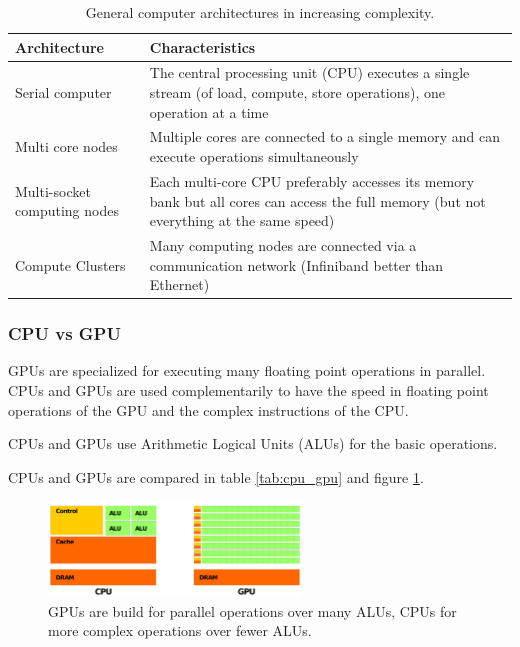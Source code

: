 \begin{table}
    \centering
    \begin{tabular}{|p{}|p{}|}
        \hline
        \textbf{Architecture} & \textbf{Characteristics} \\
        \hline
        Serial computer & The central processing unit (CPU) executes a single stream (of load, compute, store operations), one operation at a time \\
        \hline
        Multi core nodes & Multiple cores are connected to a single memory and can execute operations simultaneously \\
        \hline
        Multi-socket computing nodes & Each multi-core CPU preferably accesses its memory bank but all cores can access the full memory (but not everything at the same speed) \\
        \hline
        Compute Clusters & Many computing nodes are connected via a communication network (Infiniband better than Ethernet) \\
        \hline
    \end{tabular}
    \caption{General computer architectures in increasing complexity.}
    \label{tab:architectures}
\end{table}

\subsubsection{CPU vs GPU}
GPUs are specialized for executing many floating point operations in parallel. CPUs and GPUs
are used complementarily to have the speed in floating point operations of the GPU and the
complex instructions of the CPU.

CPUs and GPUs use Arithmetic Logical Units (ALUs) for the basic operations.

CPUs and GPUs are compared in table \ref{tab:cpu_gpu} and figure \ref{fig:cpu_gpu}.

\begin{figure}
    \centering
    \includegraphics[width=0.6\textwidth]{figures/cpu_gpu.pdf}
    \caption{GPUs are build for parallel operations over many ALUs, CPUs for more complex operations over fewer ALUs.}
    \label{fig:cpu_gpu}
\end{figure}

